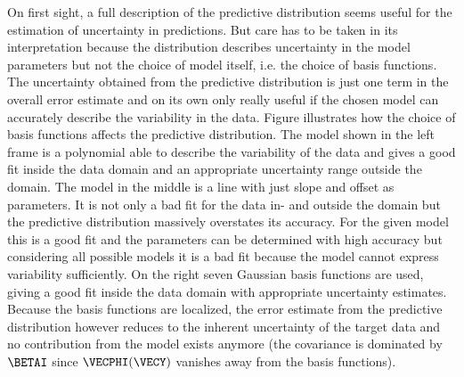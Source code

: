         {}

    On first sight, a full description of the predictive distribution seems
    useful for the estimation of uncertainty in predictions.  But care has to
    be taken in its interpretation because the distribution describes
    uncertainty in the model parameters but not the choice of model itself,
    i.e. the choice of basis functions. The uncertainty obtained from the
    predictive distribution is just one term in the overall error estimate and
    on its own only really useful if the chosen model can accurately describe
    the variability in the data.  Figure 
    illustrates how the choice of basis functions affects the predictive
    distribution. The model shown in the left frame is a polynomial able
    to describe the variability of the data and gives a good fit inside the
    data domain and an appropriate uncertainty range outside the domain. The
    model in the middle is a line with just slope and offset as parameters. It
    is not only a bad fit for the data in- and outside the domain but the
    predictive distribution massively overstates its accuracy. For the given
    model this is a good fit and the parameters can be determined with high
    accuracy but considering all possible models it is a bad fit because the
    model cannot express variability sufficiently. On the right seven Gaussian
    basis functions are used, giving a good fit inside the data domain with
    appropriate uncertainty estimates. Because the basis functions are
    localized, the error estimate from the predictive distribution however
    reduces to the inherent uncertainty of the target data and no contribution
    from the model exists anymore (the covariance is dominated by $\BETAI$
    since $\VECPHI(\VECY)$ vanishes away from the basis functions).

